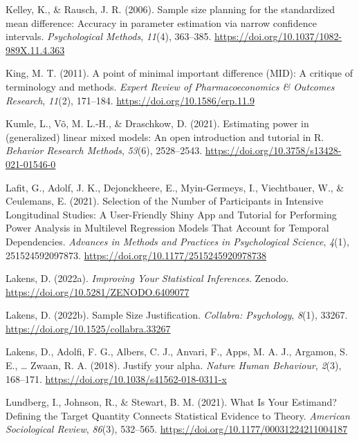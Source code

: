 \documentclass[
  man,floatsintext]{apa6}
\newlength{\cslhangindent}
\newlength{\cslentryspacingunit} %
\newenvironment{CSLReferences}[2] %
 {%
  \setlength{\parindent}{0pt}
  \ifodd #1
  \let\oldpar\par
  \def\par{\hangindent=\cslhangindent\oldpar}
  \fi
  \setlength{\parskip}{#2\cslentryspacingunit}
 }%
 {}
\begin{document}
\begin{CSLReferences}{1}{0}
\leavevmode{}%
Kelley, K., \& Rausch, J. R. (2006). Sample size planning for the standardized mean difference: {Accuracy} in parameter estimation via narrow confidence intervals. \emph{Psychological Methods}, \emph{11}(4), 363--385. \url{https://doi.org/10.1037/1082-989X.11.4.363}

\leavevmode{}%
King, M. T. (2011). A point of minimal important difference ({MID}): A critique of terminology and methods. \emph{Expert Review of Pharmacoeconomics \& Outcomes Research}, \emph{11}(2), 171--184. \url{https://doi.org/10.1586/erp.11.9}

\leavevmode{}%
Kumle, L., Võ, M. L.-H., \& Draschkow, D. (2021). Estimating power in (generalized) linear mixed models: {An} open introduction and tutorial in {R}. \emph{Behavior Research Methods}, \emph{53}(6), 2528--2543. \url{https://doi.org/10.3758/s13428-021-01546-0}

\leavevmode{}%
Lafit, G., Adolf, J. K., Dejonckheere, E., Myin-Germeys, I., Viechtbauer, W., \& Ceulemans, E. (2021). Selection of the {Number} of {Participants} in {Intensive Longitudinal Studies}: {A User-Friendly Shiny App} and {Tutorial} for {Performing Power Analysis} in {Multilevel Regression Models That Account} for {Temporal Dependencies}. \emph{Advances in Methods and Practices in Psychological Science}, \emph{4}(1), 251524592097873. \url{https://doi.org/10.1177/2515245920978738}

\leavevmode{}%
Lakens, D. (2022a). \emph{Improving {Your Statistical Inferences}}. Zenodo. \url{https://doi.org/10.5281/ZENODO.6409077}

\leavevmode{}%
Lakens, D. (2022b). Sample {Size Justification}. \emph{Collabra: Psychology}, \emph{8}(1), 33267. \url{https://doi.org/10.1525/collabra.33267}

\leavevmode{}%
Lakens, D., Adolfi, F. G., Albers, C. J., Anvari, F., Apps, M. A. J., Argamon, S. E., \ldots{} Zwaan, R. A. (2018). Justify your alpha. \emph{Nature Human Behaviour}, \emph{2}(3), 168--171. \url{https://doi.org/10.1038/s41562-018-0311-x}

\leavevmode{}%
Lundberg, I., Johnson, R., \& Stewart, B. M. (2021). What {Is Your Estimand}? {Defining} the {Target Quantity Connects Statistical Evidence} to {Theory}. \emph{American Sociological Review}, \emph{86}(3), 532--565. \url{https://doi.org/10.1177/00031224211004187}


\end{CSLReferences}
\end{document}
